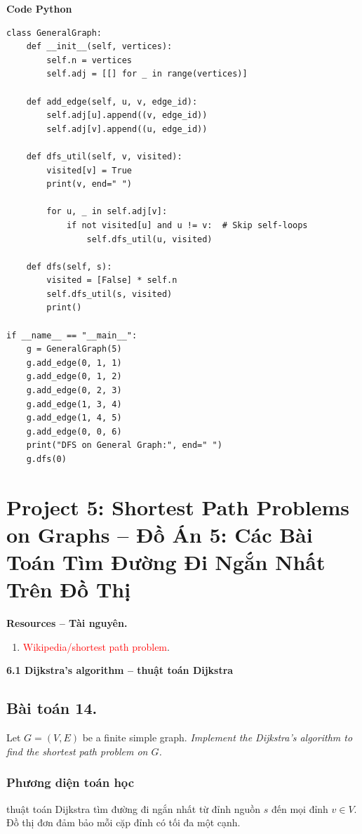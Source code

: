 \documentclass[a4paper,12pt]{article}
\begin{document}
\textbf{Code Python}
\lstset{language=Python}
\begin{lstlisting}
class GeneralGraph:
    def __init__(self, vertices):
        self.n = vertices
        self.adj = [[] for _ in range(vertices)]

    def add_edge(self, u, v, edge_id):
        self.adj[u].append((v, edge_id))
        self.adj[v].append((u, edge_id))

    def dfs_util(self, v, visited):
        visited[v] = True
        print(v, end=" ")

        for u, _ in self.adj[v]:
            if not visited[u] and u != v:  # Skip self-loops
                self.dfs_util(u, visited)

    def dfs(self, s):
        visited = [False] * self.n
        self.dfs_util(s, visited)
        print()

if __name__ == "__main__":
    g = GeneralGraph(5)
    g.add_edge(0, 1, 1)
    g.add_edge(0, 1, 2)
    g.add_edge(0, 2, 3)
    g.add_edge(1, 3, 4)
    g.add_edge(1, 4, 5)
    g.add_edge(0, 0, 6)
    print("DFS on General Graph:", end=" ")
    g.dfs(0)
\end{lstlisting}

\newpage

\section{Project 5: Shortest Path Problems on Graphs – Đồ Án 5: Các Bài Toán Tìm Đường Đi Ngắn Nhất Trên Đồ Thị}

\textbf{Resources – Tài nguyên.}
\begin{enumerate}
    \item \textcolor{red}{Wikipedia/shortest path problem}.
\end{enumerate}

\textbf{6.1 Dijkstra’s algorithm – thuật toán Dijkstra}

\subsection{Bài toán 14.} Let $G = (V, E)$ be a finite simple graph. \textit{Implement the Dijkstra’s algorithm to find the shortest path problem on $G$.}

\subsubsection{Phương diện toán học}
thuật toán Dijkstra tìm đường đi ngắn nhất từ đỉnh nguồn \( s \) đến mọi đỉnh \( v \in V \). Đồ thị đơn đảm bảo mỗi cặp đỉnh có tối đa một cạnh.
\end{document}
